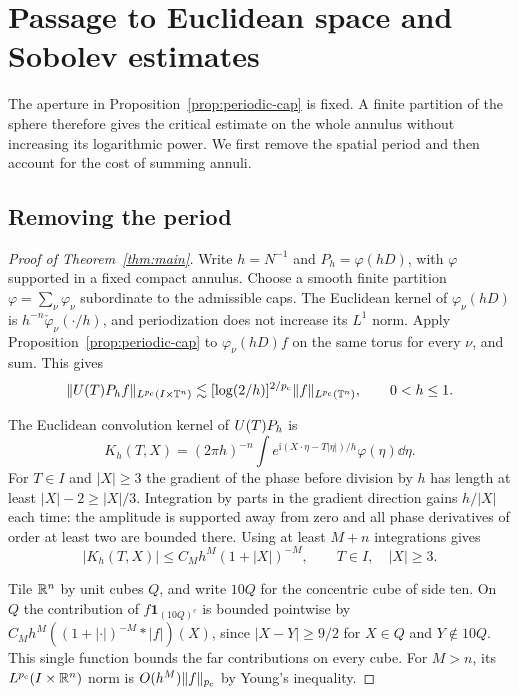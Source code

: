 \section{Passage to Euclidean space and Sobolev estimates}\label{sec:transfer}

The aperture in Proposition~\ref{prop:periodic-cap} is fixed. A finite
partition of the sphere therefore gives the critical estimate on the
whole annulus without increasing its logarithmic power. We first remove
the spatial period and then account for the cost of summing annuli.

\subsection{Removing the period}

\begin{proof}[Proof of Theorem~\ref{thm:main}]
Write $h=N^{-1}$ and $P_h=\varphi(hD)$, with $\varphi$ supported
in a fixed compact annulus. Choose a smooth finite partition
$\varphi=\sum_\nu\varphi_\nu$ subordinate to the admissible caps.
The Euclidean kernel of $\varphi_\nu(hD)$ is
$h^{-n}\check\varphi_\nu(\cdot/h)$, and periodization does not increase
its $L^1$ norm. Apply Proposition~\ref{prop:periodic-cap} to
$\varphi_\nu(hD)f$ on the same torus for every $\nu$, and sum. This gives
\begin{equation}\label{eq:periodic-critical}
 \|U(T)P_h f\|_{L^{p_{\mathrm c}}(I\times\mathbb T^n)}
 \lesssim [\log(2/h)]^{2/p_{\mathrm c}}\|f\|_{L^{p_{\mathrm c}}(\mathbb T^n)},\qquad 0<h\le1.
\end{equation}

The Euclidean convolution kernel of $U(T)P_h$ is
\[
 K_h(T,X)=(2\pi h)^{-n}
 \int e^{\mathrm i(X\cdot\eta-T|\eta|)/h}\varphi(\eta)\dd\eta .
\]
For $T\in I$ and $|X|\ge3$ the gradient of the phase before division
by $h$ has length at least $|X|-2\ge|X|/3$. Integration by parts in
the gradient direction gains $h/|X|$ each time: the amplitude is
supported away from zero and all phase derivatives of order at least
two are bounded there. Using at least $M+n$ integrations gives
\begin{equation}\label{eq:off-cone-kernel}
 |K_h(T,X)|\le C_M h^M(1+|X|)^{-M},
 \qquad T\in I,\quad |X|\ge3 .
\end{equation}

Tile $\mathbb R^n$ by unit cubes $Q$, and write $10Q$ for the concentric
cube of side ten. On $Q$ the contribution of $f\mathbf1_{(10Q)^c}$
is bounded pointwise by
$C_M h^M ((1+|\cdot|)^{-M}*|f|)(X)$, since $|X-Y|\ge9/2$ for
$X\in Q$ and $Y\notin10Q$. This single function bounds the far
contributions on every cube. For $M>n$, its $L^{p_{\mathrm c}}(I\times\mathbb R^n)$
norm is $O(h^M)\|f\|_{p_{\mathrm c}}$ by Young's inequality.


\end{proof}

